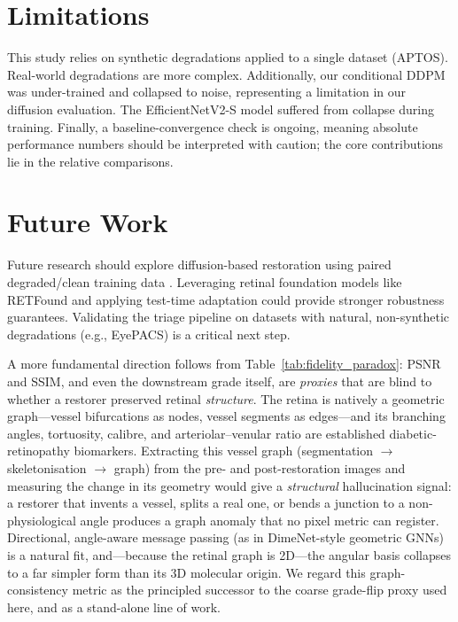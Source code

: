 \documentclass[runningheads]{llncs}
\begin{document}
\section{Limitations}
This study relies on synthetic degradations applied to a single dataset (APTOS). Real-world degradations are more complex. Additionally, our conditional DDPM was under-trained and collapsed to noise, representing a limitation in our diffusion evaluation. The EfficientNetV2-S model suffered from collapse during training. Finally, a baseline-convergence check is ongoing, meaning absolute performance numbers should be interpreted with caution; the core contributions lie in the relative comparisons.

\section{Future Work}
Future research should explore diffusion-based restoration using paired degraded/clean training data \cite{arxiv230809388}. Leveraging retinal foundation models like RETFound \cite{zhou2023retfound} and applying test-time adaptation \cite{wang2021tent} could provide stronger robustness guarantees. Validating the triage pipeline on datasets with natural, non-synthetic degradations (e.g., EyePACS) is a critical next step.

A more fundamental direction follows from Table~\ref{tab:fidelity_paradox}: PSNR and SSIM, and even the downstream grade itself, are \textit{proxies} that are blind to whether a restorer preserved retinal \textit{structure}. The retina is natively a geometric graph---vessel bifurcations as nodes, vessel segments as edges---and its branching angles, tortuosity, calibre, and arteriolar--venular ratio are established diabetic-retinopathy biomarkers. Extracting this vessel graph (segmentation $\rightarrow$ skeletonisation $\rightarrow$ graph) from the pre- and post-restoration images and measuring the change in its geometry would give a \textit{structural} hallucination signal: a restorer that invents a vessel, splits a real one, or bends a junction to a non-physiological angle produces a graph anomaly that no pixel metric can register. Directional, angle-aware message passing (as in DimeNet-style geometric GNNs) is a natural fit, and---because the retinal graph is 2D---the angular basis collapses to a far simpler form than its 3D molecular origin. We regard this graph-consistency metric as the principled successor to the coarse grade-flip proxy used here, and as a stand-alone line of work.
\end{document}
